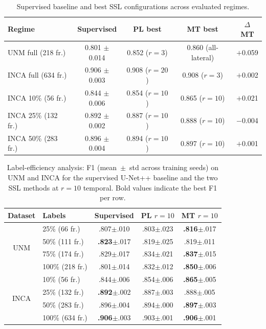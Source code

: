 \documentclass[
  msc,
  american
]{ThesisPUC_v2}
\begin{document}
\begin{table}[!t]
\centering
\footnotesize
\caption{Supervised baseline and best SSL configurations across evaluated regimes.}
\label{tab:ssl_summary}
\begin{tabular}{@{}lcccc@{}}
\toprule
\textbf{Regime} & \textbf{Supervised} & \textbf{PL best} & \textbf{MT best} & \textbf{$\Delta$ MT} \\
\midrule
UNM full (218 fr.)     & 0.801 $\pm$ 0.014 & 0.852 ($r{=}3$)     & 0.860 (all-lateral) & $+$0.059 \\
INCA full (634 fr.)    & 0.906 $\pm$ 0.003 & 0.908 ($r{=}20$)    & 0.908 ($r{=}3$)     & $+$0.002 \\
INCA 10\% (56 fr.)     & 0.844 $\pm$ 0.006 & 0.854 ($r{=}10$)    & 0.865 ($r{=}10$)    & $+$0.021 \\
INCA 25\% (132 fr.)    & 0.892 $\pm$ 0.002 & 0.887 ($r{=}10$)    & 0.888 ($r{=}10$)    & $-$0.004 \\
INCA 50\% (283 fr.)    & 0.896 $\pm$ 0.004 & 0.894 ($r{=}10$)    & 0.897 ($r{=}10$)    & $+$0.001 \\
\bottomrule
\end{tabular}
\end{table}

\begin{table}[!t]
\centering
\caption[Label-efficiency analysis.]{Label-efficiency analysis: F1 (mean~$\pm$~std across training seeds) on UNM and INCA for the supervised U-Net++ baseline and the two SSL methods at $r{=}10$ temporal. Bold values indicate the best F1 per row.}
\label{tab:label_eff}
\footnotesize
\begin{tabular}{@{}clccc@{}}
\toprule
\textbf{Dataset} & \textbf{Labels} & \textbf{Supervised} & \textbf{PL $r{=}10$} & \textbf{MT $r{=}10$} \\
\midrule
\multirow{4}{*}{UNM}
 & 25\% (66 fr.)  & .807$\pm$.010 & .803$\pm$.023 & \textbf{.816}$\pm$.017 \\
 & 50\% (111 fr.) & \textbf{.823}$\pm$.017 & .819$\pm$.025 & .819$\pm$.011 \\
 & 75\% (174 fr.) & .829$\pm$.017 & .834$\pm$.021 & \textbf{.837}$\pm$.015 \\
 & 100\% (218 fr.) & .801$\pm$.014 & .832$\pm$.012 & \textbf{.850}$\pm$.006 \\
\midrule
\multirow{4}{*}{INCA}
 & 10\% (56 fr.)  & .844$\pm$.006 & .854$\pm$.006 & \textbf{.865}$\pm$.005 \\
 & 25\% (132 fr.) & \textbf{.892}$\pm$.002 & .887$\pm$.003 & .888$\pm$.005 \\
 & 50\% (283 fr.) & .896$\pm$.004 & .894$\pm$.000 & \textbf{.897}$\pm$.003 \\
 & 100\% (634 fr.) & \textbf{.906}$\pm$.003 & .903$\pm$.001 & \textbf{.906}$\pm$.001 \\
\bottomrule
\end{tabular}
\end{table}
\end{document}
